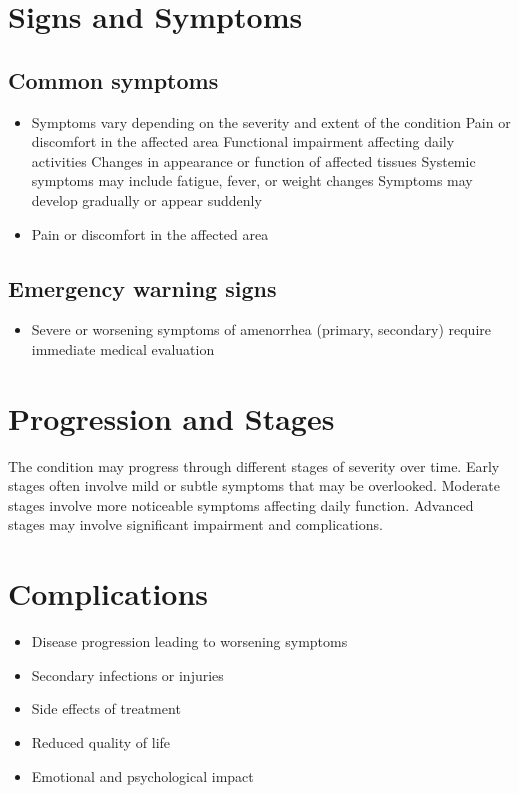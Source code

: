 \section{Signs and Symptoms}

\subsection{Common symptoms}
\begin{itemize}[noitemsep]
  \item Symptoms vary depending on the severity and extent of the condition Pain or discomfort in the affected area Functional impairment affecting daily activities Changes in appearance or function of affected tissues Systemic symptoms may include fatigue, fever, or weight changes Symptoms may develop gradually or appear suddenly
  \item Pain or discomfort in the affected area
  \end{itemize}

\subsection{Emergency warning signs}
\begin{itemize}[noitemsep]
  \item Severe or worsening symptoms of amenorrhea (primary, secondary) require immediate medical evaluation
\end{itemize}
\section{Progression and Stages}
The condition may progress through different stages of severity over time. Early stages often involve mild or subtle symptoms that may be overlooked. Moderate stages involve more noticeable symptoms affecting daily function. Advanced stages may involve significant impairment and complications.
\section{Complications}
\begin{itemize}[noitemsep]
  \item Disease progression leading to worsening symptoms
  \item Secondary infections or injuries
  \item Side effects of treatment
  \item Reduced quality of life
  \item Emotional and psychological impact
\end{itemize}
